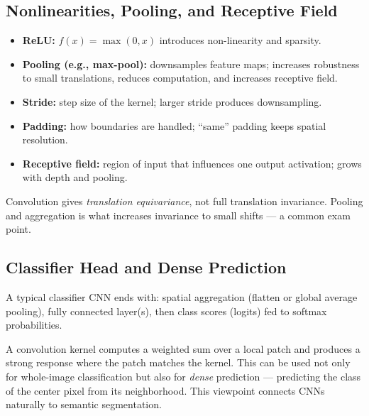 \documentclass[11pt, oneside]{book}
\begin{document}
\subsection{Nonlinearities, Pooling, and Receptive Field}

\begin{defbox}[title={ReLU and Pooling}]
\begin{itemize}
  \item \textbf{ReLU:} $f(x)=\max(0,x)$ introduces non-linearity and sparsity.
  \item \textbf{Pooling (e.g., max-pool):} downsamples feature maps; increases robustness to small translations,
  reduces computation, and increases receptive field.
\end{itemize}
\end{defbox}

\begin{itemize}
  \item \textbf{Stride:} step size of the kernel; larger stride produces downsampling.
  \item \textbf{Padding:} how boundaries are handled; ``same'' padding keeps spatial resolution.
  \item \textbf{Receptive field:} region of input that influences one output activation; grows with depth and pooling.
\end{itemize}

Convolution gives \emph{translation equivariance}, not full translation invariance.
Pooling and aggregation is what increases invariance to small shifts --- a common exam point.

\subsection{Classifier Head and Dense Prediction}

A typical classifier CNN ends with: spatial aggregation (flatten or global average pooling),
fully connected layer(s), then class scores (logits) fed to softmax probabilities.

A convolution kernel computes a weighted sum over a local patch and produces a strong response
where the patch matches the kernel. This can be used not only for whole-image classification but also for
\emph{dense} prediction --- predicting the class of the center pixel from its neighborhood.
This viewpoint connects CNNs naturally to semantic segmentation.


\end{document}
